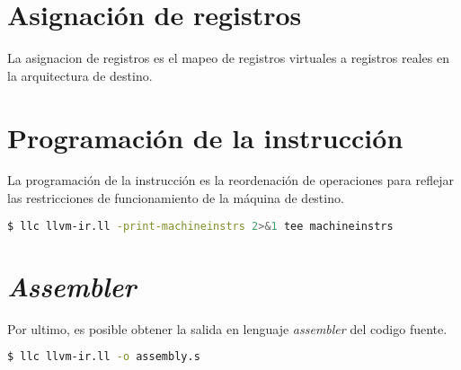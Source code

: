\section{Asignación de registros} 

La asignacion de registros es el mapeo de registros virtuales a registros 
reales en la arquitectura de destino.

\section{Programación de la instrucción}

La programación de la instrucción es la reordenación de operaciones para 
reflejar las restricciones de funcionamiento de la máquina de destino.

\begin{lstlisting}[label=comandoC, caption= Comando de compilación para obtener machineinstrs \cite{repositorio} para CLANG/LLVM., language=bash]
    $ llc llvm-ir.ll -print-machineinstrs 2>&1 tee machineinstrs \end{lstlisting}

\section{\emph{Assembler}}
Por ultimo, es posible obtener la salida en lenguaje \emph{assembler} del codigo fuente.

\begin{lstlisting}[label=comandoC, caption= Comando de compilación para obtener assembly.s \cite{repositorio} para CLANG/LLVM., language=bash]
    $ llc llvm-ir.ll -o assembly.s \end{lstlisting}
